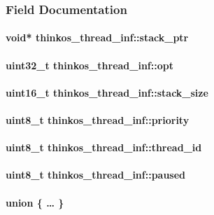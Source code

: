 {{}

\subsubsection{\texorpdfstring{{Field
Documentation}}{Field Documentation}}\label{field-documentation}

\paragraph{\texorpdfstring{{void*
thinkos\_thread\_inf::stack\_ptr}}{void* thinkos\_thread\_inf::stack\_ptr}}\label{void-thinkos_thread_infstack_ptr}

\hypertarget{h.xvir7l}{\paragraph{\texorpdfstring{{uint32\_t
thinkos\_thread\_inf::opt}}{uint32\_t thinkos\_thread\_inf::opt}}\label{h.xvir7l}}

\hypertarget{h.3hv69ve}{\paragraph{\texorpdfstring{{uint16\_t
thinkos\_thread\_inf::stack\_size}}{uint16\_t thinkos\_thread\_inf::stack\_size}}\label{h.3hv69ve}}

\hypertarget{h.1x0gk37}{\paragraph{\texorpdfstring{{uint8\_t
thinkos\_thread\_inf::priority}}{uint8\_t thinkos\_thread\_inf::priority}}\label{h.1x0gk37}}

\hypertarget{h.4h042r0}{\paragraph{\texorpdfstring{{uint8\_t
thinkos\_thread\_inf::thread\_id}}{uint8\_t thinkos\_thread\_inf::thread\_id}}\label{h.4h042r0}}

\hypertarget{h.2w5ecyt}{\paragraph{\texorpdfstring{{uint8\_t
thinkos\_thread\_inf::paused}}{uint8\_t thinkos\_thread\_inf::paused}}\label{h.2w5ecyt}}

\hypertarget{h.1baon6m}{\paragraph{\texorpdfstring{{union \{ \ldots{} \}
}}{union \{ \ldots{} \} }}\label{h.1baon6m}}

}
